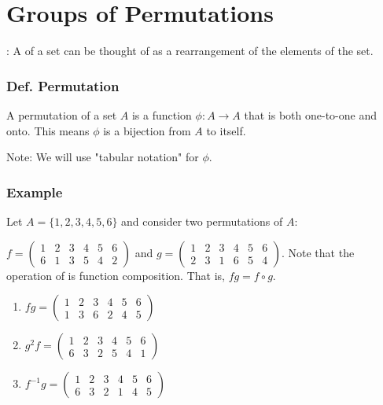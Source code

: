 \section{Groups of Permutations}

: A  of a set can be thought of as a rearrangement of the elements of the set.

\subsubsection{Def. Permutation}
A permutation of a set $A$ is a function $\phi: A \rightarrow A$ that is both one-to-one and onto. This means $\phi$ is a bijection from $A$ to itself.

Note: We will use "tabular notation" for $\phi$.

\subsubsection*{Example}
Let $A = \{1,2,3,4,5,6\}$ and consider two permutations of $A$: 

$f = \begin{pmatrix}
    1 & 2 & 3 & 4 & 5 & 6 \\
    6 & 1 & 3 & 5 & 4 & 2
\end{pmatrix}$ and $g = \begin{pmatrix}
    1 & 2 & 3 & 4 & 5 & 6 \\
    2 & 3 & 1 & 6 & 5 & 4
\end{pmatrix}$. Note that the operation of  is function composition. That is, $fg = f \circ g$.
\begin{enumerate}
    \item $fg = \begin{pmatrix}
        1 & 2 & 3 & 4 & 5 & 6 \\
        1 & 3 & 6 & 2 & 4 & 5
    \end{pmatrix}$
    \item $g^2f = \begin{pmatrix}
        1 & 2 & 3 & 4 & 5 & 6 \\
        6 & 3 & 2 & 5 & 4 & 1
    \end{pmatrix}$
    \item $f^{-1}g = \begin{pmatrix}
        1 & 2 & 3 & 4 & 5 & 6 \\
        6 & 3 & 2 & 1 & 4 & 5
    \end{pmatrix}$
\end{enumerate}

